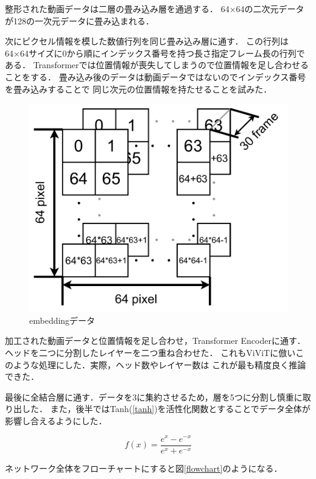 整形された動画データは二層の畳み込み層を通過する．
64×64の二次元データが128の一次元データに畳み込まれる．

次にピクセル情報を模した数値行列を同じ畳み込み層に通す．
この行列は64×64サイズに0から順にインデックス番号を持つ長さ指定フレーム長の行列である．
Transformerでは位置情報が喪失してしまうので位置情報を足し合わせることをする．
畳み込み後のデータは動画データではないのでインデックス番号を畳み込みすることで
同じ次元の位置情報を持たせることを試みた．

\begin{figure}[b]
  \begin{center}
    \includegraphics[width=120mm]{images/chart/embedding.pdf}
  \end{center}
  \caption{embeddingデータ}
  \label{embedding}
\end{figure}

加工された動画データと位置情報を足し合わせ，Transformer Encoderに通す．
ヘッドを二つに分割したレイヤーを二つ重ね合わせた．
これもViViTに倣いこのような処理にした．実際，ヘッド数やレイヤー数は
これが最も精度良く推論できた．
\clearpage

最後に全結合層に通す．データを3に集約させるため，層を5つに分割し慎重に取り出した．
また，後半ではTanh(\ref{tanh})を活性化関数とすることでデータ全体が影響し合えるようにした．

\begin{equation}
  f(x) = \frac{e^x - e^{-x}}{e^x + e^{-x}}
  \label{tanh}
\end{equation}

ネットワーク全体をフローチャートにすると図\ref{flowchart}のようになる．

